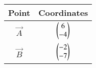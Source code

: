 \begin{tabular}{ |c| c|}
    \hline
    \textbf{Point}  & \textbf{Coordinates}\\
    \hline
    $\vec{A}$ & $\begin{pmatrix}6\\-4\end{pmatrix}$ \\
    \hline
    $\vec{B}$ & $\begin{pmatrix}-2\\-7\end{pmatrix}$\\
    \hline
\end{tabular}
